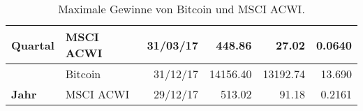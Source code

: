 \documentclass[a4paper,12pt]{article}
\begin{document}
\begin{table}[h]
{\begin{tabular}{ll|r|r|r|r|}
\multicolumn{1}{l|}{\multirow{-2}{*}{\textbf{Quartal}}} & {\color[HTML]{C0C0C0} MSCI ACWI} & {\color[HTML]{C0C0C0} 31/03/17} & {\color[HTML]{C0C0C0} 448.86} & {\color[HTML]{C0C0C0} 27.02} & {\color[HTML]{C0C0C0} 0.0640} \\ \hline
\multicolumn{1}{l|}{}                                   & Bitcoin                          & 31/12/17                        & 14156.40                      & 13192.74                     & 13.690                        \\ \cline{2-6} 
\multicolumn{1}{l|}{\multirow{-2}{*}{\textbf{Jahr}}}    & {\color[HTML]{C0C0C0} MSCI ACWI} & {\color[HTML]{C0C0C0} 29/12/17} & {\color[HTML]{C0C0C0} 513.02} & {\color[HTML]{C0C0C0} 91.18} & {\color[HTML]{C0C0C0} 0.2161} \\ \hline
\end{tabular}
}\\
\caption{Maximale Gewinne von Bitcoin und MSCI ACWI.}
\label{AnhangTab1}
\end{table}
\end{document}
